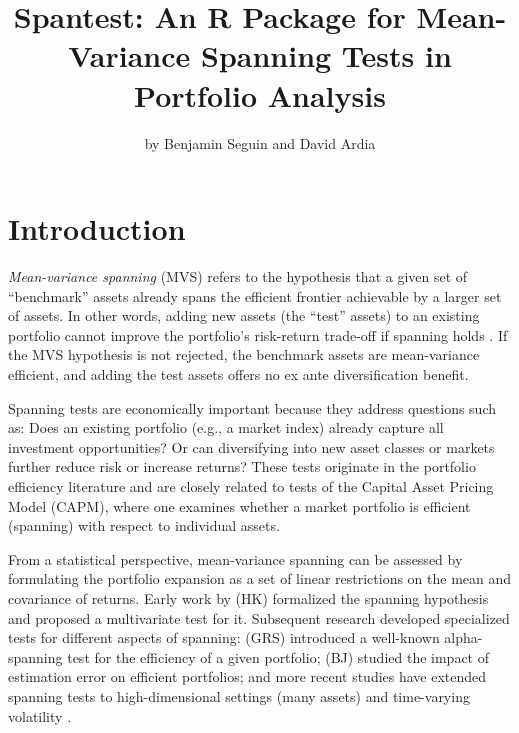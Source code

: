 \title{Spantest: An R Package for Mean-Variance Spanning Tests in Portfolio Analysis}


\author{by Benjamin Seguin and David Ardia}

\maketitle


\section{Introduction}\label{introduction}

\emph{Mean-variance spanning} (MVS) refers to the hypothesis that a given set
of ``benchmark'' assets already spans the efficient frontier achievable by
a larger set of assets. In other words, adding new assets (the ``test''
assets) to an existing portfolio cannot improve the portfolio's
risk-return trade-off if spanning holds \citep{HubermanKandel1987}. If the
MVS hypothesis is not rejected, the benchmark assets are mean-variance
efficient, and adding the test assets offers no ex ante diversification
benefit.

Spanning tests are economically important because they address questions
such as: Does an existing portfolio (e.g., a market index) already
capture all investment opportunities? Or can diversifying into new asset
classes or markets further reduce risk or increase returns? These tests
originate in the portfolio efficiency literature \citep{GRS1989} and are
closely related to tests of the Capital Asset Pricing Model (CAPM),
where one examines whether a market portfolio is efficient (spanning)
with respect to individual assets.

From a statistical perspective, mean-variance spanning can be assessed
by formulating the portfolio expansion as a set of linear restrictions
on the mean and covariance of returns. Early work by \citet{HubermanKandel1987}
(HK) formalized the spanning hypothesis and proposed a multivariate test
for it. Subsequent research developed specialized tests for different
aspects of spanning: \citet{GRS1989} (GRS) introduced a well-known
alpha-spanning test for the efficiency of a given portfolio;
\citet{BrittenJones1999} (BJ) studied the impact of estimation error on
efficient portfolios; and more recent studies have extended spanning
tests to high-dimensional settings (many assets) and time-varying
volatility \citep{GungorLuger2016}.

